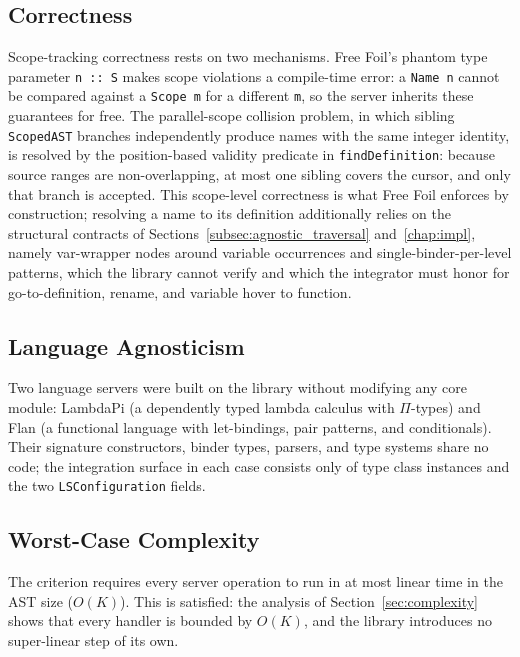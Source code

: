 \subsection{Correctness}

Scope-tracking correctness rests on two mechanisms.
Free Foil's phantom type parameter \texttt{n~::~S} makes scope violations a compile-time error: a \texttt{Name n} cannot be compared against a \texttt{Scope m} for a different \texttt{m}, so the server inherits these guarantees for free.
The parallel-scope collision problem, in which sibling \texttt{ScopedAST} branches independently produce names with the same integer identity, is resolved by the position-based validity predicate in \texttt{findDefinition}: because source ranges are non-overlapping, at most one sibling covers the cursor, and only that branch is accepted.
This scope-level correctness is what Free Foil enforces by construction; resolving a name to its definition additionally relies on the structural contracts of Sections~\ref{subsec:agnostic_traversal} and~\ref{chap:impl}, namely var-wrapper nodes around variable occurrences and single-binder-per-level patterns, which the library cannot verify and which the integrator must honor for go-to-definition, rename, and variable hover to function.

\subsection{Language Agnosticism}

Two language servers were built on the library without modifying any core module: LambdaPi (a dependently typed lambda calculus with $\Pi$-types) and Flan (a functional language with let-bindings, pair patterns, and conditionals).
Their signature constructors, binder types, parsers, and type systems share no code; the integration surface in each case consists only of type class instances and the two \texttt{LSConfiguration} fields.

\subsection{Worst-Case Complexity}

The criterion requires every server operation to run in at most linear time in the AST size ($O(K)$).
This is satisfied: the analysis of Section~\ref{sec:complexity} shows that every handler is bounded by $O(K)$, and the library introduces no super-linear step of its own.

